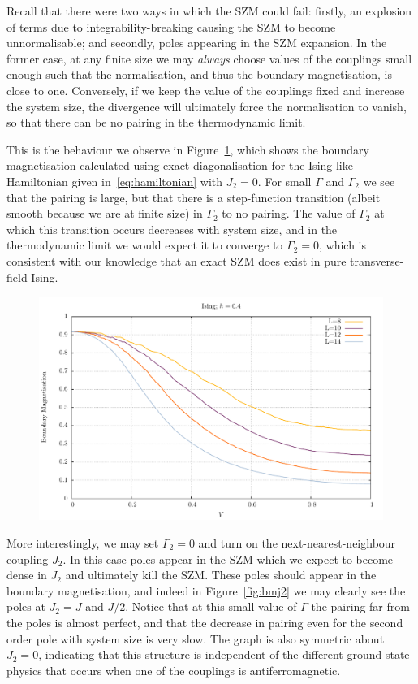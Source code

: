 \documentclass [a4paper, 11pt]{article}
\begin{document}
Recall that there were two ways in which the SZM could fail: firstly, an explosion of terms due to integrability-breaking causing the SZM to become unnormalisable; and secondly, poles appearing in the SZM expansion. In the former case, at any finite size we may \emph{always} choose values of the couplings small enough such that the normalisation, and thus the boundary magnetisation, is close to one. Conversely, if we keep the value of the couplings fixed and increase the system size, the divergence will ultimately force the normalisation to vanish, so that there can be no pairing in the thermodynamic limit.

This is the behaviour we observe in Figure~\ref{fig:bmgamma2}, which shows the boundary magnetisation calculated using exact diagonalisation for the Ising-like Hamiltonian given in~\eqref{eq:hamiltonian} with $J_2 = 0$. For small $\Gamma$ and $\Gamma_2$ we see that the pairing is large, but that there is a step-function transition (albeit smooth because we are at finite size) in $\Gamma_2$ to no pairing. The value of $\Gamma_2$ at which this transition occurs decreases with system size, and in the thermodynamic limit we would expect it to converge to $\Gamma_2 = 0$, which is consistent with our knowledge that an exact SZM does exist in pure transverse-field Ising. 

\begin{figure} [htbp]
\centering
 \includegraphics[width=\linewidth]{V_mag.pdf}
\caption{}
\label{fig:bmgamma2}
\end{figure}


More interestingly, we may set $\Gamma_2 = 0$ and turn on the next-nearest-neighbour coupling $J_2$. In this case poles appear in the SZM which we expect to become dense in $J_2$ and ultimately kill the SZM. These poles should appear in the boundary magnetisation, and indeed in Figure~\ref{fig:bmj2} we may clearly see the poles at $J_2 =  J$ and $J/2$. Notice that at this small value of $\Gamma$ the pairing far from the poles is almost perfect, and that the decrease in pairing even for the second order pole with system size is very slow. The graph is also symmetric about $J_2 = 0$, indicating that this structure is independent of the different ground state physics that occurs when one of the couplings is antiferromagnetic.
\end{document}
